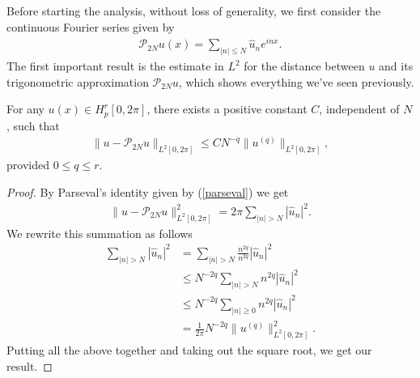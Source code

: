    Before starting the analysis, without loss of generality, we first consider the continuous Fourier series given by
        \begin{align*}
            \displaystyle \mathcal{P}_{2N} u(x) = \sum_{|n| \leq N} \hat{u}_n e^{in x}.
        \end{align*}
    The first important result is the estimate in $L^2$ for the distance between $u$ and its trigonometric approximation $\mathcal{P}_{2N} u$, which shows everything we've seen previously. 
    \\
    \begin{teor}
    \label{estimating_error_PN_L2}	
    For any $u(x) \in H_p^r [0, 2\pi]$, there exists a positive constant $C$, independent of $N$, such that
        \begin{align*}
    	    \|u - \mathcal{P}_{2N} u \|_{L^2 [0, 2\pi]} \leq C N^{-q} \|u^{(q)}\|_{L^2 [0, 2\pi]},
    	\end{align*}
    provided $0 \leq q \leq r$.
    \end{teor}
    \begin{proof}	
    By Parseval’s identity given by (\ref{parseval}) we get
    	\begin{align*}
    	    \|u - \mathcal{P}_{2N} u \|^2_{L^2 [0, 2\pi]} = 2\pi \displaystyle \sum_{|n| > N} |\hat{u}_n|^2.
    	\end{align*}
    We rewrite this summation as follows
    	\begin{align*}
    	    \displaystyle \sum_{|n| > N} |\hat{u}_n|^2 &= \sum_{|n| > N} \frac{n^{2q}}{n^{2q}} |\hat{u}_n|^2 \\
    	    &\leq N^{-2q} \sum_{|n| > N} n^{2q} |\hat{u}_n|^2 \\
    	    &\leq N^{-2q} \sum_{|n| \geq 0} n^{2q} |\hat{u}_n|^2 \\
    	    &= \frac{1}{2\pi} N^{-2q} \|u^{(q)}\|^2_{L^2 [0, 2\pi]}.
    	\end{align*}
    Putting all the above together and taking out the square root, we get our result.
	\end{proof}
    
